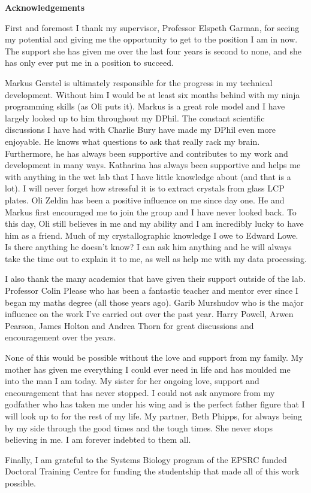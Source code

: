 \newenvironment{acknowledgements}%
{\cleardoublepage\thispagestyle{empty}\null\vfill\begin{center}%
\bfseries Acknowledgements\end{center}}%
{\vfill\null}
\begin{acknowledgements}
\small
\singlespacing
First and foremost I thank my supervisor, Professor Elspeth Garman, for seeing my potential and giving me the opportunity to get to the position I am in now.
The support she has given me over the last four years is second to none, and she has only ever put me in a position to succeed.

Markus Gerstel is ultimately responsible for the progress in my technical development.
Without him I would be at least six months behind with my ninja programming skills (as Oli puts it).
Markus is a great role model and I have largely looked up to him throughout my DPhil.
The constant scientific discussions I have had with Charlie Bury have made my DPhil even more enjoyable.
He knows what questions to ask that really rack my brain.
Furthermore, he has always been supportive and contributes to my work and development in many ways.
Katharina has always been supportive and helps me with anything in the wet lab that I have little knowledge about (and that is a lot).
I will never forget how stressful it is to extract crystals from glass LCP plates.
Oli Zeldin has been a positive influence on me since day one.
He and Markus first encouraged me to join the group and I have never looked back.
To this day, Oli still believes in me and my ability and I am incredibly lucky to have him as a friend.
Much of my crystallographic knowledge I owe to Edward Lowe.
Is there anything he doesn't know?
I can ask him anything and he will always take the time out to explain it to me, as well as help me with my data processing.

I also thank the many academics that have given their support outside of the lab.
Professor Colin Please who has been a fantastic teacher and mentor ever since I began my maths degree (all those years ago).
Garib Murshudov who is the major influence on the work I've carried out over the past year.
Harry Powell, Arwen Pearson, James Holton and Andrea Thorn for great discussions and encouragement over the years.

None of this would be possible without the love and support from my family.
My mother has given me everything I could ever need in life and has moulded me into the man I am today.
My sister for her ongoing love, support and encouragement that has never stopped.
I could not ask anymore from my godfather who has taken me under his wing and is the perfect father figure that I will look up to for the rest of my life.
My partner, Beth Phipps, for always being by my side through the good times and the tough times.
She never stops believing in me.
I am forever indebted to them all.

Finally, I am grateful to the Systems Biology program of the EPSRC funded Doctoral Training Centre for funding the studentship that made all of this work possible.
\end{acknowledgements}
